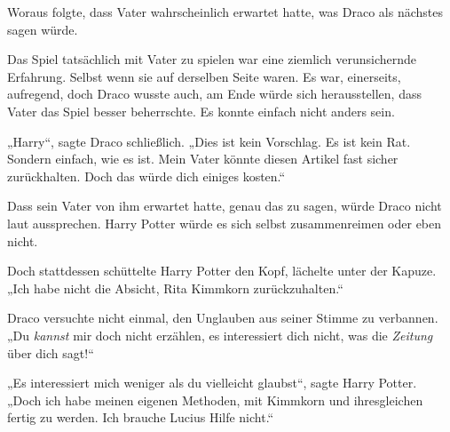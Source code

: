 Woraus folgte, dass Vater wahrscheinlich erwartet hatte, was Draco als nächstes sagen würde.

Das Spiel tatsächlich mit Vater zu spielen war eine ziemlich verunsichernde Erfahrung. Selbst wenn sie auf derselben Seite waren. Es war, einerseits, aufregend, doch Draco wusste auch, am Ende würde sich herausstellen, dass Vater das Spiel besser beherrschte. Es konnte einfach nicht anders sein.

„Harry“, sagte Draco schließlich. „Dies ist kein Vorschlag. Es ist kein Rat. Sondern einfach, wie es ist. Mein Vater könnte diesen Artikel fast sicher zurückhalten. Doch das würde dich einiges kosten.“

Dass sein Vater von ihm erwartet hatte, genau das zu sagen, würde Draco nicht laut aussprechen. Harry Potter würde es sich selbst zusammenreimen oder eben nicht.

Doch stattdessen schüttelte Harry Potter den Kopf, lächelte unter der Kapuze. „Ich habe nicht die Absicht, Rita Kimmkorn zurückzuhalten.“

Draco versuchte nicht einmal, den Unglauben aus seiner Stimme zu verbannen. „Du \emph{kannst} mir doch nicht erzählen, es interessiert dich nicht, was die \emph{Zeitung} über dich sagt!“

„Es interessiert mich weniger als du vielleicht glaubst“, sagte Harry Potter. „Doch ich habe meinen eigenen Methoden, mit Kimmkorn und ihresgleichen fertig zu werden. Ich brauche Lucius Hilfe nicht.“

